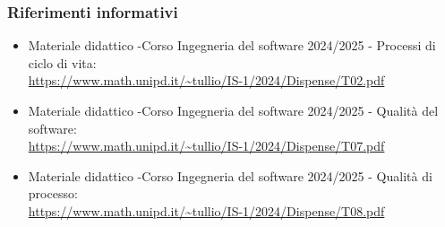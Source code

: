         \subsubsection{Riferimenti informativi}
        \begin{itemize}
            \item Materiale didattico -Corso Ingegneria del software 2024/2025 - Processi di ciclo di vita: \\ \url{https://www.math.unipd.it/~tullio/IS-1/2024/Dispense/T02.pdf}
            \item Materiale didattico -Corso Ingegneria del software 2024/2025 - Qualità del software: \\ \url{https://www.math.unipd.it/~tullio/IS-1/2024/Dispense/T07.pdf}
            \item Materiale didattico -Corso Ingegneria del software 2024/2025 - Qualità di processo: \\ \url{https://www.math.unipd.it/~tullio/IS-1/2024/Dispense/T08.pdf}
        \end{itemize}